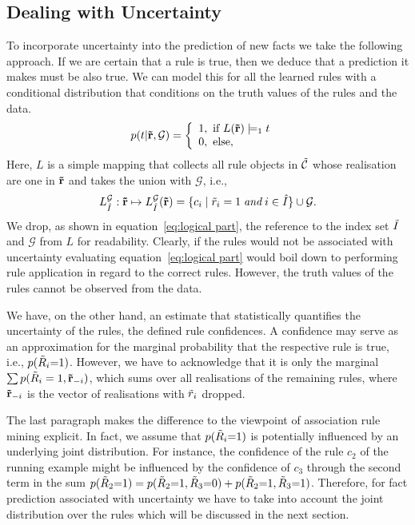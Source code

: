\documentclass{article}
\theoremstyle{plain}
\theoremstyle{remark}
\newcommand{\allatomrules}{\Tilde{\mathcal{C}}}
\newcommand{\atomrule}{c}
\newcommand{\vecallrules}{\mathbf{\Tilde{r}}}
\newcommand{\oneruleassignment}{\Tilde{r}}
\newcommand{\onerulRV}{\Tilde{R}}
\newcommand{\alltriples}{\mathcal{G}}
\newcommand{\indexSetAll}{\Tilde{I}}
\begin{document}
\subsection{Dealing with Uncertainty}
To incorporate uncertainty into the prediction of new facts we take the following approach. If we are certain that a rule is true, then we deduce that a prediction it makes must be also true. We can model this for all the learned rules with a conditional distribution that conditions on the truth values of the rules and the data.
\begin{align}
   p(t |  \mathbf{\vecallrules}, \alltriples)  = \left\{ \begin{array}{l} \label{eq:logical part}
    1, \textrm{ if $L(\mathbf{\vecallrules}) \models_1 t$   } \ \\
    0, \textrm{ else},
  \end{array}\right.
\end{align}
Here, $L$ is a simple mapping that collects all rule objects in $\allatomrules$ whose realisation are one in $\vecallrules$ and takes the union with $\alltriples$, i.e.,
\begin{align}
    L_{{\hat{I}}}^{\alltriples}: \vecallrules \mapsto  L_{{\hat{I}}}^{\alltriples}(\mathbf{\vecallrules}) = \{\atomrule_i  \;| \; \oneruleassignment_i = 1 \; \textit{and} \; i \in \hat{I} \} \cup \alltriples.
\end{align}
We drop, as shown in equation~\eqref{eq:logical part}, the reference to the index set $\indexSetAll$ and $\alltriples$ from $L$ for readability. Clearly, if the rules would not be associated with uncertainty evaluating equation~\eqref{eq:logical part} would boil down to performing rule application in regard to the correct rules. However, the truth values of the rules cannot be observed from the data.

We have, on the other hand, an estimate that statistically quantifies the uncertainty of the rules, the defined rule confidences. A confidence may serve as an approximation for the marginal probability that the respective rule is true, i.e., $p(\onerulRV_i{=}1)$. However, we have to acknowledge that it is only the marginal $\sum p(\onerulRV_i=1, \vecallrules_{-i})$, which sums over all realisations of the remaining rules, where $\vecallrules_{-i}$ is the vector of realisations with $\oneruleassignment_i$ dropped.

The last paragraph makes the difference to the viewpoint of association rule mining explicit. In fact, we assume that $p(\onerulRV_i{=}1)$ is potentially influenced by an underlying joint distribution. For instance, the confidence of the rule $c_2$ of the running example might be influenced by the confidence of $c_3$ through the second term in the sum $p(\onerulRV_2{=}1) = p(\onerulRV_2{=}1, \onerulRV_3{=} 0) +  p(\onerulRV_2{=}1, \onerulRV_3{=} 1)$. Therefore, for fact prediction associated with uncertainty we have to take into account the joint distribution over the rules which will be discussed in the next section.
\end{document}
